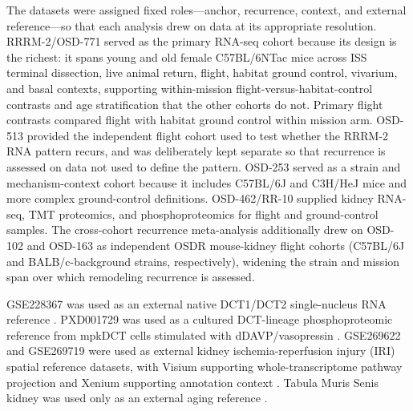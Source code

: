 \documentclass[11pt]{article}
\begin{document}
The datasets were assigned fixed roles---anchor, recurrence, context, and external reference---so that each analysis drew on data at its appropriate resolution. RRRM-2/OSD-771 served as the primary RNA-seq cohort because its design is the richest: it spans young and old female C57BL/6NTac mice across ISS terminal dissection, live animal return, flight, habitat ground control, vivarium, and basal contexts, supporting within-mission flight-versus-habitat-control contrasts and age stratification that the other cohorts do not. Primary flight contrasts compared flight with habitat ground control within mission arm. OSD-513 provided the independent flight cohort used to test whether the RRRM-2 RNA pattern recurs, and was deliberately kept separate so that recurrence is assessed on data not used to define the pattern. OSD-253 served as a strain and mechanism-context cohort because it includes C57BL/6J and C3H/HeJ mice and more complex ground-control definitions. OSD-462/RR-10 supplied kidney RNA-seq, TMT proteomics, and phosphoproteomics for flight and ground-control samples. The cross-cohort recurrence meta-analysis additionally drew on OSD-102 and OSD-163 as independent OSDR mouse-kidney flight cohorts (C57BL/6J and BALB/c-background strains, respectively), widening the strain and mission span over which remodeling recurrence is assessed. %

GSE228367 was used as an external native DCT1/DCT2 single-nucleus RNA reference \citep{su2024dct}. PXD001729 was used as a cultured DCT-lineage phosphoproteomic reference from mpkDCT cells stimulated with dDAVP/vasopressin \citep{cheng2015mpkdct}. GSE269622 and GSE269719 were used as external kidney ischemia-reperfusion injury (IRI) spatial reference datasets, with Visium supporting whole-transcriptome pathway projection and Xenium supporting annotation context \citep{spatial2025iri}. Tabula Muris Senis kidney was used only as an external aging reference \citep{tabula2020}.
\end{document}
